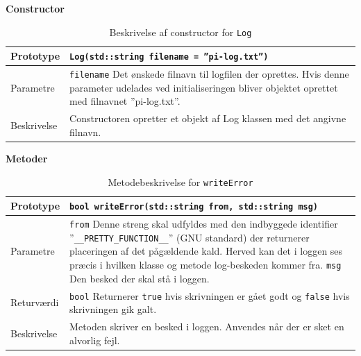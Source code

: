 \textbf{Constructor}
\begin{table}[h]
\begin{tabularx}{\textwidth}{| L{2.5 cm} | Z |} \hline
Prototype & \texttt{Log(std::string filename = ''pi-log.txt'')} \\\hline
Parametre & \texttt{filename} \newline Det ønskede filnavn til logfilen der oprettes. Hvis denne parameter udelades ved initialiseringen bliver objektet oprettet med filnavnet ''pi-log.txt''.  \\\hline
Beskrivelse & Constructoren opretter et objekt af Log klassen med det angivne filnavn. \\\hline
\end{tabularx}
\caption{Beskrivelse af constructor for \texttt{Log}}
\label{table:con_log}
\end{table}

\clearpage

\textbf{Metoder}
\begin{table}[h]
\begin{tabularx}{\textwidth}{| L{2.5 cm} | Z |} \hline
Prototype & \texttt{bool writeError(std::string from, std::string msg)} \\\hline
Parametre & \texttt{from} \newline Denne streng skal udfyldes med den indbyggede identifier ''\texttt{\_\_PRETTY\_FUNCTION\_\_}'' (GNU standard) der returnerer placeringen af det pågældende kald. Herved kan det i loggen ses præcis i hvilken klasse og metode log-beskeden kommer fra. \newline \newline \texttt{msg} \newline Den besked der skal stå i loggen. \\\hline
Returværdi &  \texttt{bool} \newline Returnerer \texttt{true} hvis skrivningen er gået godt og \texttt{false} hvis skrivningen gik galt. \\\hline
Beskrivelse & Metoden skriver en besked i loggen. Anvendes når der er sket en alvorlig fejl. \\\hline
\end{tabularx}
\caption{Metodebeskrivelse for \texttt{writeError}}
\label{table:met_writeError}
\end{table}

